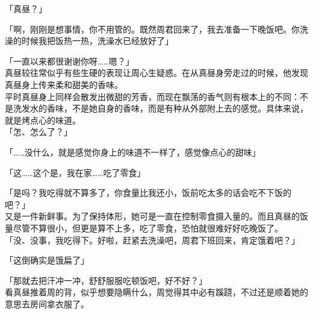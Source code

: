 「真昼？」

「啊，刚刚是想事情，你不用管的。既然周君回来了，我去准备一下晚饭吧。你洗澡的时候我把饭热一热，洗澡水已经放好了」

「一直以来都很谢谢你呀……嗯？」\\

真昼较往常似乎有些生硬的表现让周心生疑惑。在从真昼身旁走过的时候，他发现真昼身上传来柔和甜美的香味。\\

平时真昼身上同样会散发出微甜的芳香，而现在飘荡的香气则有根本上的不同：不是洗发水的香味，不是她自身的香味，而是有种从外部附上去的感觉。具体来说，就是烤点心的味道。\\

「怎、怎么了？」

「……没什么，就是感觉你身上的味道不一样了，感觉像点心的甜味」

「这……这个是，我在家……吃了零食」

「是吗？我吃得就不算多了，你食量比我还小，饭前吃太多的话会吃不下饭的吧？」\\

又是一件新鲜事。为了保持体形，她可是一直在控制零食摄入量的。而且真昼的饭量尽管不算很小，但更是算不上多，吃了零食，恐怕就很难好好吃晚饭了。\\

「没、没事，我吃得下。好啦，赶紧去洗澡吧，周君下班回来，肯定饿着吧？」

「这倒确实是饿扁了」

「那就去把汗冲一冲，舒舒服服吃顿饭吧，好不好？」\\

看真昼推着周的背，似乎想要隐瞒什么，周觉得其中必有蹊跷，不过还是顺着她的意思去房间拿衣服了。
